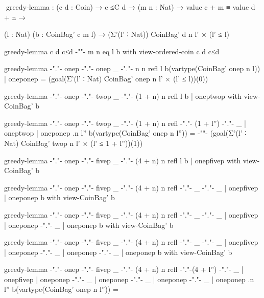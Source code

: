 \begin{sidewaysfigure}
\codefigure\fontsize{10pt}{0pt}\setlength{\blanklineskip}{-3.5pt}
\begin{code}
^^^greedy-lemma :  (c d : Coin) → c ≤C d → (m n : Nat) → value c + m ≡ value d + n →

                   (l : Nat) (b : CoinBag' c m l) → (Σ'(l' ∶ Nat)) CoinBag' d n l' × (l' ≤ l)

greedy-lemma          c               d      c≤d  {-""-}   m                n        eq             l                   b  with view-ordered-coin c d c≤d

greedy-lemma {-"."-}  onep   {-"."-}  onep   _    {-"."-}  n                n        refl           l                   b(vartype(CoinBag' onep n l))  | oneponep = (goal(Σ'(l' ∶ Nat) CoinBag' onep n l' × (l' ≤ l))(0))

greedy-lemma {-"."-}  onep   {-"."-}  twop   _    {-"."-}  (1 + n)          n        refl           l                   b  | oneptwop   with view-CoinBag' b

greedy-lemma {-"."-}  onep   {-"."-}  twop   _    {-"."-}  (1 + n)          n        refl  {-"."-}  (1 + l'')  {-"."-}  _  | oneptwop   | oneponep {.n} {l''} b(vartype(CoinBag' onep n l'')) =
{-"\hfill"-} (goal(Σ'(l' ∶ Nat) CoinBag' twop n l' × (l' ≤ 1 + l''))(1))

greedy-lemma {-"."-}  onep   {-"."-}  fivep  _    {-"."-}  (4 + n)          n        refl           l                   b  | onepfivep  with view-CoinBag' b

greedy-lemma {-"."-}  onep   {-"."-}  fivep  _    {-"."-}  (4 + n)          n        refl  {-"."-}  _          {-"."-}  _  | onepfivep  | oneponep          b  with view-CoinBag' b

greedy-lemma {-"."-}  onep   {-"."-}  fivep  _    {-"."-}  (4 + n)          n        refl  {-"."-}  _          {-"."-}  _  | onepfivep  | oneponep {-"."-}  _  | oneponep          b  with view-CoinBag' b

greedy-lemma {-"."-}  onep   {-"."-}  fivep  _    {-"."-}  (4 + n)          n        refl  {-"."-}  _          {-"."-}  _  | onepfivep  | oneponep {-"."-}  _  | oneponep {-"."-}  _  | oneponep          b  with view-CoinBag' b

greedy-lemma {-"."-}  onep   {-"."-}  fivep  _    {-"."-}  (4 + n)          n        refl  {-"."-}(4 + l'')    {-"."-}  _  | onepfivep  | oneponep {-"."-}  _  | oneponep {-"."-}  _  | oneponep {-"."-}  _  | oneponep {.n} {l''} b(vartype(CoinBag' onep n l'')) =


\end{code}
\end{sidewaysfigure}
